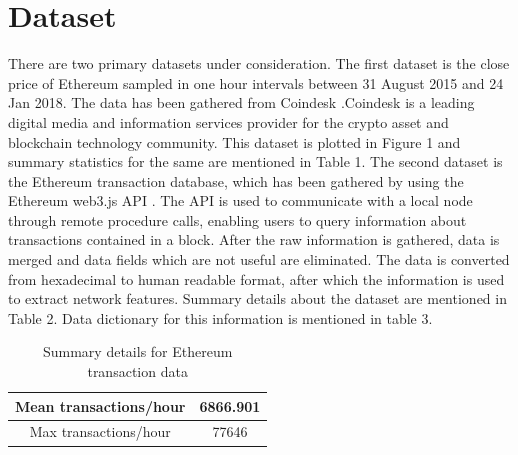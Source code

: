 \documentclass[12pt]{article}%
\begin{document}
\section{Dataset}
There are two primary datasets under consideration. The first dataset is the close price of Ethereum sampled in one hour intervals between 31 August 2015 and 24 Jan 2018. The data has been gathered from Coindesk \cite{44}.Coindesk is a leading digital media and information services provider for the crypto asset and blockchain technology community.  This dataset is plotted in Figure 1 and summary statistics for the same are mentioned in Table 1. The second dataset is the Ethereum transaction database, which has been gathered by using the Ethereum web3.js API \cite{27}. The API is used to communicate with a local node through remote procedure calls, enabling users to query information about transactions contained in a block. After the raw information is gathered, data is merged and data fields which are not useful are eliminated. The data is converted from hexadecimal to human readable format, after which the information is used to extract network features. Summary details about the dataset are mentioned in Table 2. Data dictionary for this information is mentioned in table 3.

	
	


\begin{center}
\begin{table}[h]
\centering
\begin{tabular}{ |c|c| } 
 \hline
 Mean transactions/hour & 6866.901 \\ 
\hline 
 Max transactions/hour & 77646 \\ 
 \hline
\end{tabular}
\\[10pt]
\caption{Summary details for Ethereum transaction data }
\end{table}
\end{center}
\end{document}
